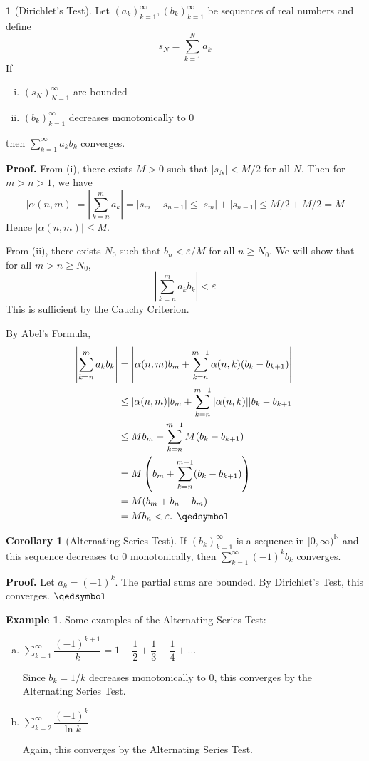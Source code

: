 \documentclass[11pt]{article}
\theoremstyle{definition}
\newtheorem{exmp}[thm]{Example}
\newtheorem{cor}[thm]{Corollary}
\newtheorem{none}[thm]{}
\newcommand{\mbN}{\ensuremath{\mathbb{N}}}
\begin{document}
\begin{none}[Dirichlet's Test]
Let $(a_k)_{k=1}^\infty, (b_k)_{k=1}^\infty$ be sequences of real numbers and define 
$$s_N = \sum_{k=1}^N a_k$$
If
\begin{enumerate}[(i)] \vspace{-0.2cm}
\item $(s_N)_{N=1}^\infty$ are bounded
\item $(b_k)_{k=1}^\infty$ decreases monotonically to 0
\end{enumerate}
then $\sum_{k=1}^\infty a_k b_k$ converges.
\end{none}
\textbf{Proof.} 
From (i), there exists $M > 0$ such that $|s_N| < M/2$ for all $N$. Then for $m > n > 1$, we have
$$|\alpha(n, m)| = \left| \sum_{k=n}^m a_k \right| = |s_m - s_{n-1}| \leq |s_m| + |s_{n-1}| \leq M/2 + M/2 = M$$
Hence $|\alpha(n, m)| \leq M$. 

From (ii), there exists $N_0$ such that $b_n < \varepsilon / M$ for all $n \geq N_0$. We will show that for all $m > n \geq N_0$,
$$\left| \sum_{k=n}^m a_k b_k \right| < \varepsilon$$
This is sufficient by the Cauchy Criterion.

By Abel's Formula,
\begin{align*}
\left| \sum_{k=n}^m a_k b_k \right| & = \left| \alpha(n, m) b_m + \sum_{k=n}^{m-1} \alpha(n, k) (b_k - b_{k+1}) \right| \\
& \leq |\alpha(n, m)| b_m + \sum_{k=n}^{m-1} |\alpha(n, k)| |b_k - b_{k+1}| \\
& \leq Mb_m + \sum_{k=n}^{m-1} M(b_k - b_{k+1}) \\
& = M \left( b_m + \sum_{k=n}^{m-1} (b_k - b_{k+1}) \right) \\
& = M(b_m + b_n - b_m) \\
& = Mb_n < \varepsilon \text{. } \qedsymbol
\end{align*}

\begin{cor}[Alternating Series Test]
If $(b_k)_{k=1}^\infty$ is a sequence in $[0, \infty)^\mbN$ and this sequence decreases to 0 monotonically, then $\sum_{k=1}^\infty (-1)^k b_k$ converges.
\end{cor}
\textbf{Proof.} Let $a_k = (-1)^k$. The partial sums are bounded. By Dirichlet's Test, this converges. $\qedsymbol$

\begin{exmp}
Some examples of the Alternating Series Test:
\begin{enumerate}[(a)] 
\item $\displaystyle\sum_{k=1}^\infty \dfrac{(-1)^{k+1}}{k} = 1 - \dfrac12 + \dfrac13 - \dfrac14 + \dots$ 

Since $b_k = 1/k$ decreases monotonically to 0, this converges by the Alternating Series Test.
\item $\displaystyle\sum_{k=2}^\infty \dfrac{(-1)^k}{\ln k}$ 

Again, this converges by the Alternating Series Test.
\end{enumerate}
\end{exmp}
\end{document}
